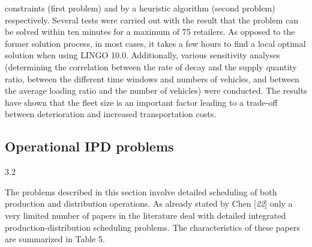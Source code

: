  constraints (first problem) and by a heuristic algorithm (second problem)
 respectively. Several tests were carried out with the result that the problem can be
 solved within ten minutes for a maximum of 75 retailers. As opposed to the former
 solution process, in most cases, it takes a few hours to find a local optimal
 solution when using LINGO 10.0. Additionally, various sensitivity analyses
 (determining the correlation between the rate of decay and the supply quantity ratio,
 between the different time windows and numbers of vehicles, and between the average
 loading ratio and the number of vehicles) were conducted. The results have shown that
 the fleet size is an important factor leading to a trade-off between deterioration
 and increased transportation costs.\subsection*{Operational IPD problems}3.2\par The problems described in this section involve detailed scheduling of both production
 and distribution operations. As already stated by Chen [\textit{22}] only a very limited number of papers in the literature deal
 with detailed integrated production-distribution scheduling problems. The
 characteristics of these papers are summarized in Table 5.\onecolumn \noindent
{}
